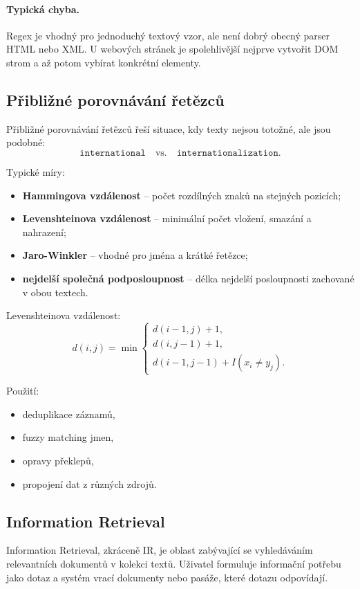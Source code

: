 \paragraph{Typická chyba.}
Regex je vhodný pro jednoduchý textový vzor, ale není dobrý obecný parser HTML nebo XML. U webových stránek je
spolehlivější nejprve vytvořit DOM strom a až potom vybírat konkrétní elementy.

\subsection{Přibližné porovnávání řetězců}

Přibližné porovnávání řetězců řeší situace, kdy texty nejsou totožné, ale jsou podobné:
\[
\texttt{international}
\quad
\text{vs.}
\quad
\texttt{internationalization}.
\]

Typické míry:
\begin{itemize}
    \item \textbf{Hammingova vzdálenost} -- počet rozdílných znaků na stejných pozicích;
    \item \textbf{Levenshteinova vzdálenost} -- minimální počet vložení, smazání a nahrazení;
    \item \textbf{Jaro-Winkler} -- vhodné pro jména a krátké řetězce;
    \item \textbf{nejdelší společná podposloupnost} -- délka nejdelší posloupnosti zachované v obou textech.
\end{itemize}

Levenshteinova vzdálenost:
\[
d(i,j)=
\min
\begin{cases}
d(i-1,j)+1,\\
d(i,j-1)+1,\\
d(i-1,j-1)+I(x_i\neq y_j).
\end{cases}
\]

Použití:
\begin{itemize}
    \item deduplikace záznamů,
    \item fuzzy matching jmen,
    \item opravy překlepů,
    \item propojení dat z různých zdrojů.
\end{itemize}

\subsection{Information Retrieval}

Information Retrieval, zkráceně IR, je oblast zabývající se vyhledáváním relevantních dokumentů v kolekci
textů. Uživatel formuluje informační potřebu jako dotaz a systém vrací dokumenty nebo pasáže, které dotazu
odpovídají.

